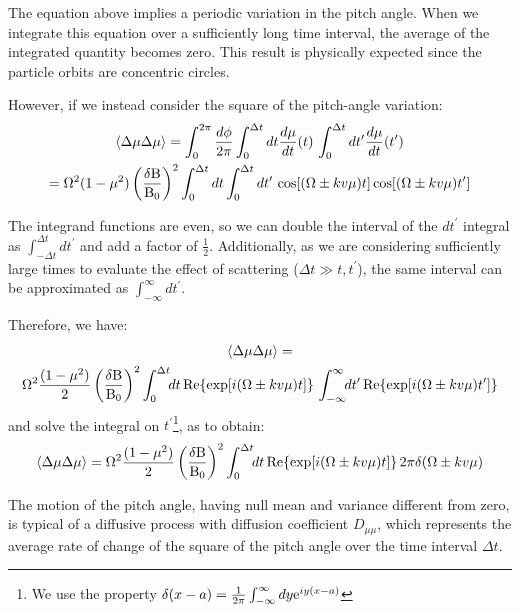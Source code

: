 The equation above implies a periodic variation in the pitch angle. When we integrate this equation over a sufficiently long time interval, the average of the integrated quantity becomes zero. This result is physically expected since the particle orbits are concentric circles.

However, if we instead consider the square of the pitch-angle variation: 
%
\begin{multline}
\langle \Delta \mu \Delta \mu \rangle = \int_0^{2\pi} \frac{d\phi}{2\pi} \int_0^{\Delta t} dt \frac{d\mu}{dt}(t) \, \int_0^{\Delta t} dt^\prime \frac{d\mu}{dt}(t^\prime) \\ = \Omega^2 (1 - \mu^2) \left( \frac{\delta {\rm B}}{{\rm B}_0} \right)^2 \int_{0}^{\Delta t} dt \int_{0}^{\Delta t} dt^\prime \, \cos[(\Omega \pm k v \mu) t] \cos[(\Omega \pm k v \mu) t^\prime]
\end{multline}

The integrand functions are even, so we can double the interval of the $dt^\prime$ integral as $\int_{-\Delta t}^{\Delta t} dt^\prime$ and add a factor of $\frac{1}{2}$. Additionally, as we are considering sufficiently large times to evaluate the effect of scattering ($\Delta t \gg t, t^\prime$), the same interval can be approximated as $\int_{-\infty}^{\infty} dt^\prime$.

Therefore, we have\cite{Shalchi2009book}:
%
\begin{multline}
\langle \Delta \mu \Delta \mu \rangle = \\ \Omega^2 \frac{(1 - \mu^2)}{2} \left( \frac{\delta {\rm B}}{{\rm B}_0} \right)^2 \int_{0}^{\Delta t} \!\! dt \, {\rm Re} \{ \exp[i(\Omega \pm k v \mu) t] \} \, \int_{-\infty}^{\infty} \!\! dt^\prime \,  {\rm Re}\{\exp[i(\Omega \pm k v \mu) t^\prime]\}
\end{multline}
%
and solve the integral on $t^\prime$\footnote{We use the property $\delta(x-a) = \frac{1}{2\pi}\int_{-\infty}^\infty dy {\rm e}^{iy(x-a)}$}, as to obtain:
%
\begin{equation}
\langle \Delta \mu \Delta \mu \rangle = \Omega^2 \frac{(1 - \mu^2)}{2} \left( \frac{\delta {\rm B}}{{\rm B}_0} \right)^2 \int_{0}^{\Delta t} \!\! dt \, {\rm Re} \{ \exp[i(\Omega \pm k v \mu) t] \} \, 2\pi \delta (\Omega \pm k v \mu)
\end{equation}

The motion of the pitch angle, having null mean and variance different from zero, is typical of a diffusive process with diffusion coefficient $D_{\mu\mu}$, which represents the average rate of change of the square of the pitch angle over the time interval $\Delta t$.

